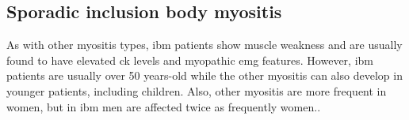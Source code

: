 \begin{table}
	\caption{Clinical features and grouping of the most main .}
	\label{tab:autoantibodies}
\end{table}

\subsection{Sporadic inclusion body myositis}

As with other myositis types, \gls{ibm} patients show muscle weakness and are usually found to have elevated \gls{ck} levels and myopathic \gls{emg} features. However, \gls{ibm} patients are usually over 50 years-old while the other myositis can also develop in younger patients, including children.\cite{SelvaOCallaghan2018} Also, other myositis are more frequent in women, but in \gls{ibm} men are affected twice as frequently women.\cite{SelvaOCallaghan2018}.

